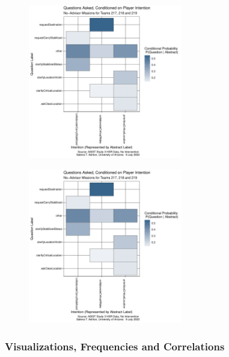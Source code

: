 \documentclass[10pt]{article}
\begin{document}
\begin{figure}[h!]
    \centering
    \includegraphics[width=0.6\textwidth]{../figures/questionLabel_ConditionalProbability_STA.pdf}
    \caption{ }
\end{figure}

\begin{figure}[h!]
    \centering
    \includegraphics[width=0.6\textwidth]{../figures/questionLabel_ConditionalProbability_STA.pdf}
    \caption{ }
\end{figure}


\clearpage

\subsubsection{Visualizations, Frequencies and Correlations}
\end{document}
